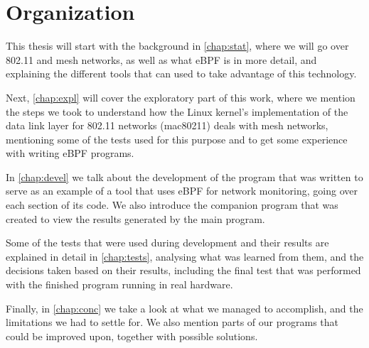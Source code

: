 \section{Organization}

This thesis will start with the background in \autoref{chap:stat}, where we will
go over 802.11 and mesh networks, as well as what eBPF is in more detail, and
explaining the different tools that can used to take advantage of this
technology.

Next, \autoref{chap:expl} will cover the exploratory part of this work, where we
mention the steps we took to understand how the Linux kernel's implementation of
the data link layer for 802.11 networks (mac80211) deals with mesh networks,
mentioning some of the tests used for this purpose and to get some experience
with writing eBPF programs.

In \autoref{chap:devel} we talk about the development of the program that was
written to serve as an example of a tool that uses eBPF for network monitoring,
going over each section of its code. We also introduce the companion program
that was created to view the results generated by the main program.

Some of the tests that were used during development and their results are
explained in detail in \autoref{chap:tests}, analysing what was learned from
them, and the decisions taken based on their results, including the final test
that was performed with the finished program running in real hardware.

Finally, in \autoref{chap:conc} we take a look at what we managed to accomplish,
and the limitations we had to settle for. We also mention parts of our programs
that could be improved upon, together with possible solutions.
